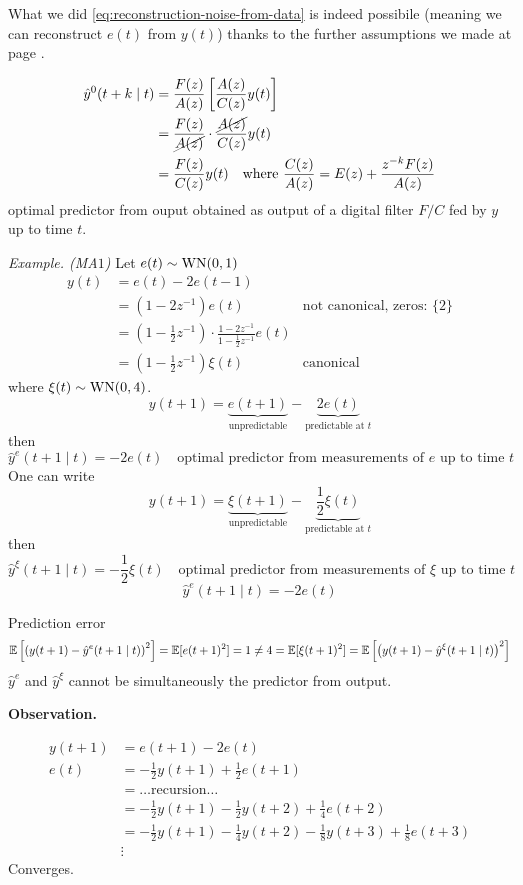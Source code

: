 
What we did \eqref{eq:reconstruction-noise-from-data} is indeed possibile (meaning we can reconstruct $e(t)$ from $y(t)$) thanks to the further assumptions we made at page \pageref{further-assumptions-prediction-theory}.



\begin{align*}
	\hat y ^{0}(t+k\mid t)&=\frac{F(z)}{A(z)}\left[ \frac{A(z)}{C(z)}y(t) \right]  \\
	&=\frac{F(z)}{\cancel{A(z)}}\cdot\frac{\cancel{A(z)}}{C(z)}y(t)\\
	&=\frac{F(z)}{C(z)}y(t) \quad \text{where }\frac{C(z)}{A(z)}=E(z)+\frac{z^{-k}F(z) }{A(z)}
\end{align*}
optimal predictor from ouput obtained as output of a digital filter $F/C$ fed by $y$ up to time $t$.

\emph{Example. (MA$1$)}
Let $e(t)\sim \operatorname{WN}(0,1)$
\begin{align*}
	y(t) &= e(t) - 2 e(t-1)\\
	&= (1-2z^{-1} )e(t) &\text{not canonical, zeros: }\{2\}\\
	&=\left( 1-\frac{1}{2} z^{-1}  \right) \cdot\frac{1-2z^{-1}}{1-\frac{1}{2} z^{-1}} e(t)\\
	&=\left( 1-\frac{1}{2} z^{-1}  \right) \xi(t) &\text{canonical}
\end{align*}
where $\xi(t)\sim \operatorname{WN}(0,4)$.
\[
	y(t+1)=\underbrace{e(t+1)}_{\text{unpredictable}}-\underbrace{2e(t)}_{\text{predictable at }t}
\]
then
\[
	\hat y ^{e}(t+1\mid t)=-2e(t) \quad \text{optimal predictor from measurements of $e$ up to time $t$} 
\]
One can write
\[
	y(t+1)=\underbrace{\xi(t+1)}_{\text{unpredictable}}-\underbrace{\frac{1}{2} \xi(t)}_{\text{predictable at }t}
\]
then
\[
	\hat y^{\xi} (t+1\mid t)=-\frac{1}{2} \xi(t) \quad \text{optimal predictor from measurements of $\xi$ up to time $t$} 
\]
\[
	\hat y^{e}(t+1\mid t)=-2e(t) 
\]


Prediction error
\[
	\mathbb{E}\left[ \left( y(t+1)-\hat y^{e}(t+1\mid t)  \right) ^2   \right]  =\mathbb{E}[e(t+1)^2 ]=1\neq 4=\mathbb{E}[\xi(t+1)^2 ]=\mathbb{E}\left[ \left( y(t+1)-\hat y ^{\xi}(t+1\mid t)  \right)^2    \right]  
\]
$\hat y^{e} $ and $\hat y^{\xi} $ cannot be simultaneously the predictor from output.

\textbf{Observation.}

\begin{align*}
	y(t+1)&=e(t+1)-2e(t)\\
	e(t)&=-\frac{1}{2} y(t+1)+\frac{1}{2} e(t+1)\\
	&= \ldots \text{recursion}\ldots \\
	&= -\frac{1}{2} y(t+1)-\frac{1}{2} y(t+2)+\frac{1}{4}e(t+2)\\
	&= -\frac{1}{2} y(t+1)-\frac{1}{4}y(t+2)-\frac{1}{8}y(t+3)+\frac{1}{8}e(t+3)\\
	&\vdots
\end{align*}
Converges.

